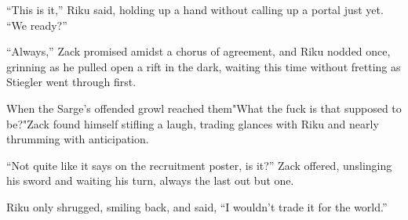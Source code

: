 ``This is it,'' Riku said, holding up a hand without calling up a portal just yet. ``We ready?''

``Always,'' Zack promised amidst a chorus of agreement, and Riku nodded once, grinning as he pulled open a rift in the dark, waiting this time without fretting as Stiegler went through first.

When the Sarge's offended growl reached them\textemdash "What the fuck is that supposed to be?"\textemdash Zack found himself stifling a laugh, trading glances with Riku and nearly thrumming with anticipation.

``Not quite like it says on the recruitment poster, is it?'' Zack offered, unslinging his sword and waiting his turn, always the last out but one.

Riku only shrugged, smiling back, and said, ``I wouldn't trade it for the world.''
